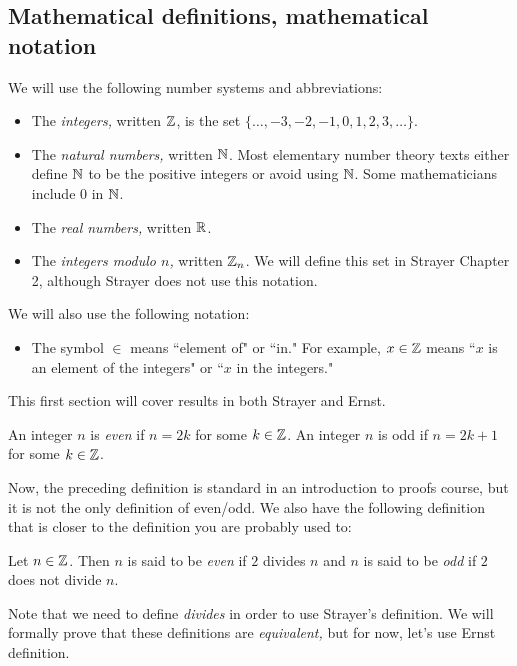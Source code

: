 \documentclass{ximera}
\begin{document}
\subsection{Mathematical definitions, mathematical notation}%
\begin{defn}\label{defn:number-systems} We will use the following number systems and abbreviations:
\begin{itemize}
 \item  The \emph{integers,} written $\mathbb Z$, is the set $\{\dots,-3,-2,-1,0,1,2,3,\dots\}$. 
 \item The \emph{natural numbers,} written $\mathbb N$. Most elementary number theory texts either define $\mathbb N$ to be the positive integers or avoid using $\mathbb N$. Some mathematicians include $0$ in $\mathbb N$.
 \item The \emph{real numbers,} written $\mathbb R$.
 \item The \emph{integers modulo $n$,} written $\mathbb Z_n$. We will define this set in Strayer Chapter 2, although Strayer does not use this notation.
\end{itemize}
We will also use the following notation:
\begin{itemize}
 \item The symbol $\in$ means ``element of" or ``in." For example, $x\in\mathbb Z$ means ``$x$ is an element of the integers" or ``$x$ in the integers."
\end{itemize}
\end{defn}

This first section will cover results in both Strayer and Ernst.

\begin{defn}\label{defn:even-odd-form}
 An integer $n$ is \emph{even} if $n=2k$ for some $k\in\mathbb Z$. An integer $n$ is odd if $n=2k+1$ for some $k\in\mathbb Z$.
\end{defn}

Now, the preceding definition is standard in an introduction to proofs course, but it is not the only definition of even/odd. We also have the following definition that is closer to the definition you are probably used to:

\begin{defn}\label{defn:even-odd-divides}
 Let $n\in\mathbb Z$. Then $n$ is said to be \emph{even} if $2$ divides $n$ and $n$ is said to be \emph{odd} if $2$ does not divide $n$.
\end{defn}
Note that we need to define \emph{divides} in order to use Strayer's definition. We will formally prove that these definitions are \emph{equivalent,} but for now, let's use Ernst definition.
 
\end{document}
